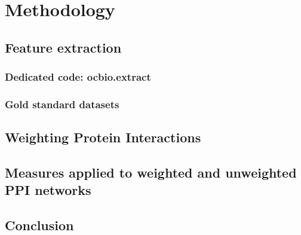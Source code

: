 \chapter{Methodology}
\label{methods}

\lipsum[5]

\section{Feature extraction}

\lipsum[10-15]

\subsection{Dedicated code: ocbio.extract}

\lipsum[15-20]

\subsection{Gold standard datasets}

\lipsum[21-25]

\section{Weighting Protein Interactions}

\lipsum[1-10]

\section{Measures applied to weighted and unweighted PPI networks}

\lipsum[15-20]


\section*{Conclusion}

\lipsum[1]
